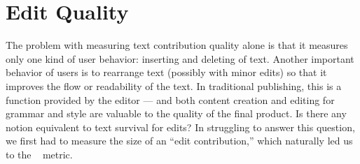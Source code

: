 \section{Edit Quality}
\label{sec:editquality}

The problem with measuring text contribution quality alone is that it
measures only one kind of user behavior: inserting and deleting of text.
Another important behavior of users is to rearrange text
(possibly with minor edits) so that it improves the flow or
readability of the text.
In traditional publishing, this is a function provided by the
editor --- and both content creation and editing for grammar and
style are valuable to the quality of the final product.
Is there any notion equivalent to text survival for edits?
In struggling to answer this question, we first had to measure
the size of an ``edit contribution,'' which naturally led us to the
~\cite{Levenshtein1966,Tichy1984,Cormode2007,Adler2007}
metric.


